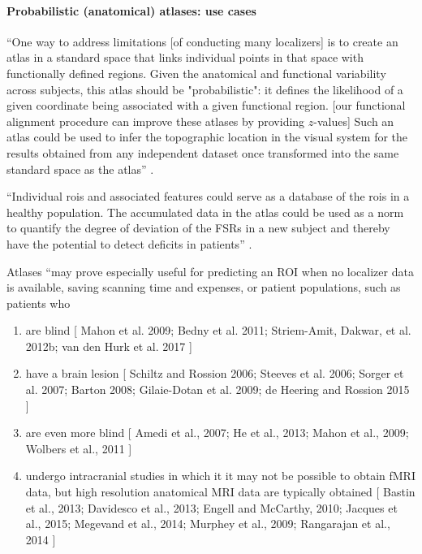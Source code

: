 \paragraph{Probabilistic (anatomical) atlases: use cases}
%
``One way to address limitations [of conducting many localizers] is to create an
atlas in a standard space that links individual points in that space with
functionally defined regions.
%
Given the anatomical and functional variability across subjects, this atlas
should be "probabilistic":
%
it defines the likelihood of a given coordinate being associated with a given
functional region. [our functional alignment procedure can improve these atlases
by providing $z$-values]
%
Such an atlas could be used to infer the topographic location in the visual
system for the results obtained from any independent dataset once transformed
into the same standard space as the atlas'' \citep{wang2015probabilistic}.

%
``Individual \acp{roi} and associated features could serve as a database of the
\acp{roi} in a healthy population.
%
The accumulated data in the atlas could be used as a norm to quantify the degree
of deviation of the FSRs in a new subject and thereby have the potential to
detect deficits in patients'' \citep{zhen2015quantifying}.

%
Atlases ``may prove especially useful for predicting an ROI when no localizer
data is available, saving scanning time and expenses, or
%
patient populations, such as patients who
%
\begin{enumerate}

\item are blind [
        Mahon et al. 2009;
        Bedny et al. 2011;
        Striem-Amit, Dakwar, et al. 2012b;
        van den Hurk et al. 2017
    ] \citep{rosenke2021probabilistic}

\item have a brain lesion [
        Schiltz and Rossion 2006;
        Steeves et al. 2006;
        Sorger et al. 2007;
        Barton 2008;
        Gilaie-Dotan et al. 2009;
        de Heering and Rossion 2015
    ] \citep{rosenke2021probabilistic}

\item are even more blind [
        Amedi et al., 2007;
        He et al., 2013;
        Mahon et al., 2009;
        Wolbers et al., 2011
    ] \citep{weiner2018defining}

\item undergo intracranial studies in which it it may not be possible to obtain
    fMRI data, but high resolution anatomical MRI data are typically obtained [
        Bastin et al., 2013;
        Davidesco et al., 2013;
        Engell and McCarthy, 2010;
        Jacques et al., 2015;
        Megevand et al., 2014;
        Murphey et al., 2009;
        Rangarajan et al., 2014
    ] \citep{weiner2018defining}

\end{enumerate}


